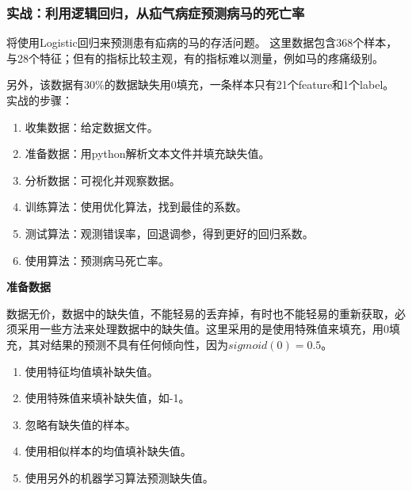 \subsubsection{实战：利用逻辑回归，从疝气病症预测病马的死亡率}
将使用Logistic回归来预测患有疝病的马的存活问题。
这里数据包含368个样本，与28个特征；但有的指标比较主观，有的指标难以测量，例如马的疼痛级别。

另外，该数据有30\%的数据缺失用0填充，一条样本只有21个feature和1个label。\\
实战的步骤：
\begin{enumerate}
  \item 收集数据：给定数据文件。
  \item 准备数据：用python解析文本文件并填充缺失值。
  \item 分析数据：可视化并观察数据。
  \item 训练算法：使用优化算法，找到最佳的系数。
  \item 测试算法：观测错误率，回退调参，得到更好的回归系数。
  \item 使用算法：预测病马死亡率。
\end{enumerate}

\noindent\textbf{准备数据}\par
数据无价，数据中的缺失值，不能轻易的丢弃掉，有时也不能轻易的重新获取，必须采用一些方法来处理数据中的缺失值。这里采用的是使用特殊值来填充，用0填充，其对结果的预测不具有任何倾向性，因为$sigmoid(0)=0.5$。
\begin{enumerate}
  \item 使用特征均值填补缺失值。
  \item 使用特殊值来填补缺失值，如-1。
  \item 忽略有缺失值的样本。
  \item 使用相似样本的均值填补缺失值。
  \item 使用另外的机器学习算法预测缺失值。
\end{enumerate}

